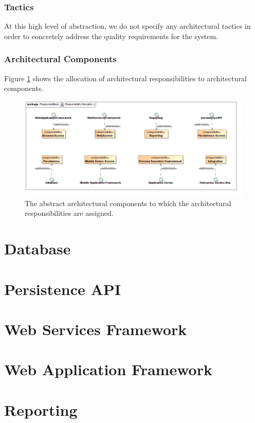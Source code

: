 \subsubsection{Tactics}
At this high level of abstraction, we do not specify any architectural tactics
in order to concretely address the quality requirements for the system.

\subsubsection{Architectural Components}
Figure \ref{fig:architectureResponsibilityAllocation} shows the allocation of
architectural responsibilities to architectural components. 
\begin{figure}[H]
	\begin{center}
	\includegraphics[scale=0.5]{../Diagrams and Charts/Architecture/ResponsibilityAllocation.jpg}
	\caption{The abstract architectural components to which the architectural responsibilities are
assigned.}
	\end{center}
	\label{fig:architectureResponsibilityAllocation}
\end{figure}

\section{Database}


\section{Persistence API}


\section{Web Services Framework}


\section{Web Application Framework}


\section{Reporting}

